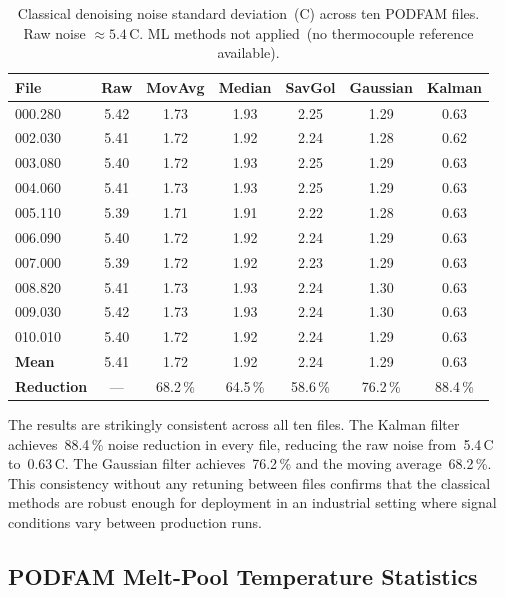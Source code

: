 \begin{table}[H]
\centering
\caption{Classical denoising noise standard deviation~(\textdegree C) across
         ten PODFAM files. Raw noise $\approx 5.4$\,\textdegree C.
         ML methods not applied~(no thermocouple reference available).}
\label{tab:podfam-denoise}
\begin{tabular}{lcccccc}
\toprule
\textbf{File} & \textbf{Raw} & \textbf{MovAvg} & \textbf{Median}
& \textbf{SavGol} & \textbf{Gaussian} & \textbf{Kalman} \\
\midrule
000.280 & 5.42 & 1.73 & 1.93 & 2.25 & 1.29 & 0.63 \\
002.030 & 5.41 & 1.72 & 1.92 & 2.24 & 1.28 & 0.62 \\
003.080 & 5.40 & 1.72 & 1.93 & 2.25 & 1.29 & 0.63 \\
004.060 & 5.41 & 1.73 & 1.93 & 2.25 & 1.29 & 0.63 \\
005.110 & 5.39 & 1.71 & 1.91 & 2.22 & 1.28 & 0.63 \\
006.090 & 5.40 & 1.72 & 1.92 & 2.24 & 1.29 & 0.63 \\
007.000 & 5.39 & 1.72 & 1.92 & 2.23 & 1.29 & 0.63 \\
008.820 & 5.41 & 1.73 & 1.93 & 2.24 & 1.30 & 0.63 \\
009.030 & 5.42 & 1.73 & 1.93 & 2.24 & 1.30 & 0.63 \\
010.010 & 5.40 & 1.72 & 1.92 & 2.24 & 1.29 & 0.63 \\
\midrule
\textbf{Mean}      & 5.41 & 1.72 & 1.92 & 2.24 & 1.29 & 0.63 \\
\textbf{Reduction} & ---  & 68.2\,\% & 64.5\,\% & 58.6\,\%
                          & 76.2\,\% & 88.4\,\% \\
\bottomrule
\end{tabular}
\end{table}

The results are strikingly consistent across all ten files. The Kalman filter
achieves~88.4\,\% noise reduction in every file, reducing the raw noise
from~5.4\,\textdegree C to~0.63\,\textdegree C. The Gaussian filter
achieves~76.2\,\% and the moving average~68.2\,\%. This consistency without any
retuning between files confirms that the classical methods are robust enough for
deployment in an industrial setting where signal conditions vary between
production runs.

\subsection{PODFAM Melt-Pool Temperature Statistics}

